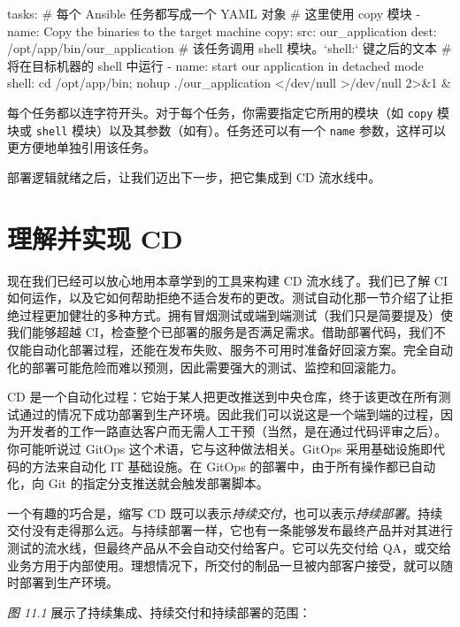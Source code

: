 \begin{codebox}[yaml]
tasks:
  # 每个 Ansible 任务都写成一个 YAML 对象
  # 这里使用 copy 模块
  - name: Copy the binaries to the target machine
    copy:
      src: our_application
      dest: /opt/app/bin/our_application
  # 该任务调用 shell 模块。`shell:` 键之后的文本
  # 将在目标机器的 shell 中运行
  - name: start our application in detached mode
    shell: cd /opt/app/bin; nohup ./our_application </dev/null >/dev/null 2>&1 &
\end{codebox}

\label{idx:952}
每个任务都以连字符开头。对于每个任务，你需要指定它所用的模块（如 \texttt{copy} 模块或 \texttt{shell} 模块）以及其参数（如有）。任务还可以有一个 \texttt{name} 参数，这样可以更方便地单独引用该任务。

部署逻辑就绪之后，让我们迈出下一步，把它集成到 CD 流水线中。

\section{理解并实现 CD}

\label{idx:953}
现在我们已经可以放心地用本章学到的工具来构建 CD 流水线了。我们已了解 CI 如何运作，以及它如何帮助拒绝不适合发布的更改。测试自动化那一节介绍了让拒绝过程更加健壮的多种方式。拥有冒烟测试或端到端测试（我们只是简要提及）使我们能够超越 CI，检查整个已部署的服务是否满足需求。借助部署代码，我们不仅能自动化部署过程，还能在发布失败、服务不可用时准备好回滚方案。完全自动化的部署可能危险而难以预测，因此需要强大的测试、监控和回滚能力。

\label{idx:954}
CD 是一个自动化过程：它始于某人把更改推送到中央仓库，终于该更改在所有测试通过的情况下成功部署到生产环境。因此我们可以说这是一个端到端的过程，因为开发者的工作一路直达客户而无需人工干预（当然，是在通过代码评审之后）。你可能听说过 GitOps 这个术语，它与这种做法相关。GitOps 采用基础设施即代码的方法来自动化 IT 基础设施。在 GitOps 的部署中，由于所有操作都已自动化，向 Git 的指定分支推送就会触发部署脚本。

一个有趣的巧合是，缩写 CD 既可以表示\emph{持续交付}，也可以表示\emph{持续部署}。持续交付没有走得那么远。与持续部署一样，它也有一条能够发布最终产品并对其进行测试的流水线，但最终产品从不会自动交付给客户。它可以先交付给 QA，或交给业务方用于内部使用。理想情况下，所交付的制品一旦被内部客户接受，就可以随时部署到生产环境。

\emph{图 11.1} 展示了持续集成、持续交付和持续部署的范围：


